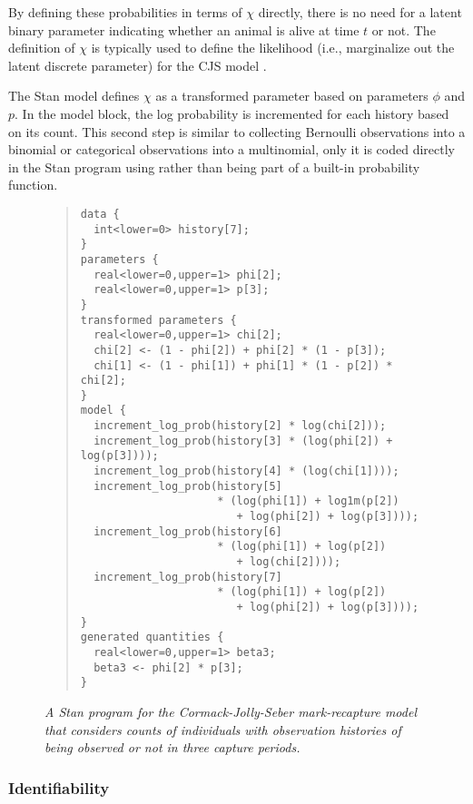By defining these probabilities in terms of $\chi$ directly, there is
no need for a latent binary parameter indicating whether an animal is
alive at time $t$ or not.  The definition of $\chi$ is typically used
to define the likelihood (i.e., marginalize out the latent discrete
parameter) for the CJS model \citep[page 9]{Schofield:2007}.

The Stan model defines $\chi$ as a transformed parameter based on
parameters $\phi$ and $p$.  In the model block, the log probability is
incremented for each history based on its count.  This second step is
similar to collecting Bernoulli observations into a binomial or
categorical observations into a multinomial, only it is coded directly
in the Stan program using  rather than
being part of a built-in probability function.
%
\begin{figure}
\begin{quote}\small
\begin{Verbatim}
data {
  int<lower=0> history[7];
}
parameters {
  real<lower=0,upper=1> phi[2];
  real<lower=0,upper=1> p[3];
}
transformed parameters {
  real<lower=0,upper=1> chi[2];  
  chi[2] <- (1 - phi[2]) + phi[2] * (1 - p[3]);
  chi[1] <- (1 - phi[1]) + phi[1] * (1 - p[2]) * chi[2];
}
model {
  increment_log_prob(history[2] * log(chi[2]));
  increment_log_prob(history[3] * (log(phi[2]) + log(p[3])));
  increment_log_prob(history[4] * (log(chi[1])));
  increment_log_prob(history[5] 
                     * (log(phi[1]) + log1m(p[2])
                        + log(phi[2]) + log(p[3])));
  increment_log_prob(history[6] 
                     * (log(phi[1]) + log(p[2]) 
                        + log(chi[2])));
  increment_log_prob(history[7] 
                     * (log(phi[1]) + log(p[2]) 
                        + log(phi[2]) + log(p[3])));
}
generated quantities {
  real<lower=0,upper=1> beta3;
  beta3 <- phi[2] * p[3];
}
\end{Verbatim}
\end{quote}
\vspace*{-12pt}
\caption{\small\it A Stan program for the Cormack-Jolly-Seber
  mark-recapture model that considers counts of individuals with
  observation histories of being observed or not in three capture
  periods.}\label{cjs-history.figure}
\end{figure}
%

\subsubsection{Identifiability}

